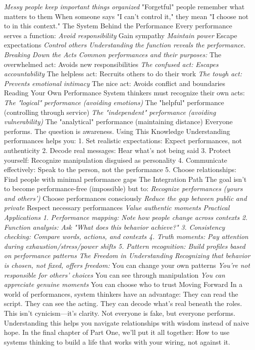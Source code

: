 \documentclass[12pt]{book}
\begin{document}
\textit{ Messy people keep important things organized
} "Forgetful" people remember what matters to them
When someone says "I can't control it," they mean "I choose not to in this context."
The System Behind the Performance
Every performance serves a function:
\textit{ Avoid responsibility
} Gain sympathy
\textit{ Maintain power
} Escape expectations
\textit{ Control others
Understanding the function reveals the performance.
Breaking Down the Acts
Common performances and their purposes:
} The overwhelmed act: Avoids new responsibilities
\textit{ The confused act: Escapes accountability
} The helpless act: Recruits others to do their work
\textit{ The tough act: Prevents emotional intimacy
} The nice act: Avoids conflict and boundaries
Reading Your Own Performance
System thinkers must recognize their own acts:
\textit{ The "logical" performance (avoiding emotions)
} The "helpful" performance (controlling through service)
\textit{ The "independent" performance (avoiding vulnerability)
} The "analytical" performance (maintaining distance)
Everyone performs. The question is awareness.
Using This Knowledge
Understanding performances helps you:
1. Set realistic expectations: Expect performances, not authenticity
2. Decode real messages: Hear what's not being said
3. Protect yourself: Recognize manipulation disguised as personality
4. Communicate effectively: Speak to the person, not the performance
5. Choose relationships: Find people with minimal performance gaps
The Integration Path
The goal isn't to become performance-free (impossible) but to:
\textit{ Recognize performances (yours and others')
} Choose performances consciously
\textit{ Reduce the gap between public and private
} Respect necessary performances
\textit{ Value authentic moments
Practical Applications
1. Performance mapping: Note how people change across contexts
2. Function analysis: Ask "What does this behavior achieve?"
3. Consistency checking: Compare words, actions, and contexts
4. Truth moments: Pay attention during exhaustion/stress/power shifts
5. Pattern recognition: Build profiles based on performance patterns
The Freedom in Understanding
Recognizing that behavior is chosen, not fixed, offers freedom:
} You can change your own patterns
\textit{ You're not responsible for others' choices
} You can see through manipulation
\textit{ You can appreciate genuine moments
} You can choose who to trust
Moving Forward
In a world of performances, system thinkers have an advantage: They can read the script. They can see the acting. They can decode what's real beneath the roles.
This isn't cynicism—it's clarity. Not everyone is fake, but everyone performs. Understanding this helps you navigate relationships with wisdom instead of naive hope.
In the final chapter of Part One, we'll put it all together: How to use systems thinking to build a life that works with your wiring, not against it.
\end{document}
